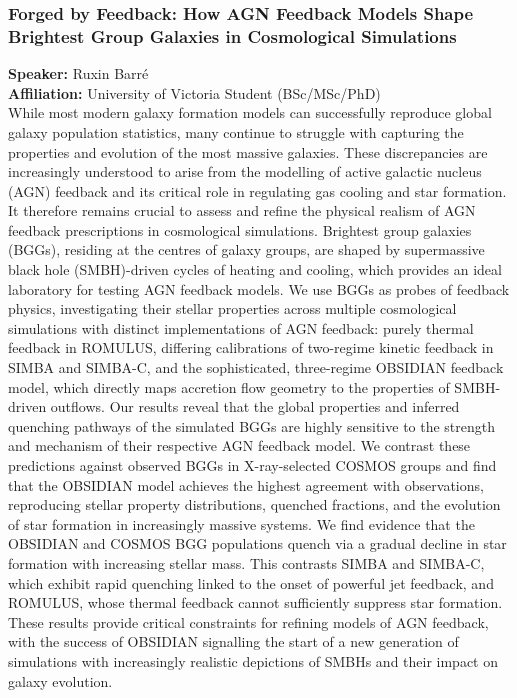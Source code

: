 \subsubsection*{Forged by Feedback: How AGN Feedback Models Shape Brightest Group Galaxies in Cosmological Simulations}
\textbf{Speaker:} Ruxin Barré \\
\textbf{Affiliation:} University of Victoria \textperiodcentered{} Student (BSc/MSc/PhD)\\
While most modern galaxy formation models can successfully reproduce global galaxy population statistics, many continue to struggle with capturing the properties and evolution of the most massive galaxies. These discrepancies are increasingly understood to arise from the modelling of active galactic nucleus (AGN) feedback and its critical role in regulating gas cooling and star formation. It therefore remains crucial to assess and refine the physical realism of AGN feedback prescriptions in cosmological simulations. Brightest group galaxies (BGGs), residing at the centres of galaxy groups, are shaped by supermassive black hole (SMBH)-driven cycles of heating and cooling, which provides an ideal laboratory for testing AGN feedback models. We use BGGs as probes of feedback physics, investigating their stellar properties across multiple cosmological simulations with distinct implementations of AGN feedback: purely thermal feedback in ROMULUS, differing calibrations of two-regime kinetic feedback in SIMBA and SIMBA-C, and the sophisticated, three-regime OBSIDIAN feedback model, which directly maps accretion flow geometry to the properties of SMBH-driven outflows. Our results reveal that the global properties and inferred quenching pathways of the simulated BGGs are highly sensitive to the strength and mechanism of their respective AGN feedback model. We contrast these predictions against observed BGGs in X-ray-selected COSMOS groups and find that the OBSIDIAN model achieves the highest agreement with observations, reproducing stellar property distributions, quenched fractions, and the evolution of star formation in increasingly massive systems. We find evidence that the OBSIDIAN and COSMOS BGG populations quench via a gradual decline in star formation with increasing stellar mass. This contrasts SIMBA and SIMBA-C, which exhibit rapid quenching linked to the onset of powerful jet feedback, and ROMULUS, whose thermal feedback cannot sufficiently suppress star formation. These results provide critical constraints for refining models of AGN feedback, with the success of OBSIDIAN signalling the start of a new generation of simulations with increasingly realistic depictions of SMBHs and their impact on galaxy evolution.

